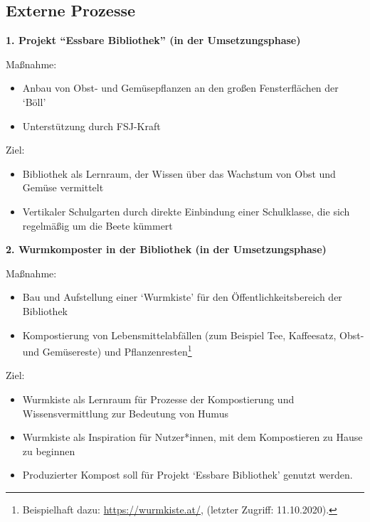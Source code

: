 \documentclass[a4paper,
fontsize=11pt,
oneside,
numbers=noperiodatend,
parskip=half-,
bibliography=totoc,
final
]{scrartcl}
\begin{document}
\hypertarget{externe-prozesse}{%
\subsection{Externe Prozesse}\label{externe-prozesse}}

\textbf{1. Projekt \enquote{Essbare Bibliothek} (in der
Umsetzungsphase)}

Maßnahme:

\begin{itemize}[itemsep=-5pt]

\item
  Anbau von Obst- und Gemüsepflanzen an den großen Fensterflächen der
  \enquote*{Böll}
\item
  Unterstützung durch FSJ-Kraft
\end{itemize}

\pagebreak
Ziel:

\begin{itemize}[itemsep=-5pt]

\item
  Bibliothek als Lernraum, der Wissen über das Wachstum von Obst und
  Gemüse vermittelt
\item
  Vertikaler Schulgarten durch direkte Einbindung einer Schulklasse, die
  sich regelmäßig um die Beete kümmert
\end{itemize}

\textbf{2. Wurmkomposter in der Bibliothek (in der Umsetzungsphase)}

Maßnahme:

\begin{itemize}[itemsep=-5pt]

\item
  Bau und Aufstellung einer \enquote*{Wurmkiste} für den
  Öffentlichkeitsbereich der Bibliothek
\item
  Kompostierung von Lebensmittelabfällen (zum Beispiel Tee, Kaffeesatz,
  Obst- und Gemüsereste) und Pflanzenresten\footnote{Beispielhaft dazu:
    \url{https://wurmkiste.at/}, (letzter Zugriff: 11.10.2020).}
\end{itemize}

Ziel:

\begin{itemize}[itemsep=-5pt]

\item
  Wurmkiste als Lernraum für Prozesse der Kompostierung und
  Wissensvermittlung zur Bedeutung von Humus
\item
  Wurmkiste als Inspiration für Nutzer*innen, mit dem Kompostieren zu
  Hause zu beginnen
\item
  Produzierter Kompost soll für Projekt \enquote*{Essbare Bibliothek}
  genutzt werden.
\end{itemize}
\end{document}
